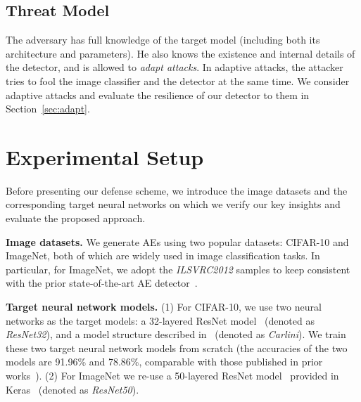 \documentclass[sigconf]{acmart}
\begin{document}
\subsection{Threat Model}

The adversary has full knowledge of the target model (including both its architecture and parameters). He also knows the existence and internal details of the detector, and is allowed to \emph{adapt attacks}. In adaptive attacks, the attacker tries to fool the image classifier and the detector at the same time.
We consider adaptive attacks and evaluate the resilience of our
detector to them in Section~\ref{sec:adapt}.

\section{Experimental Setup}\label{sec:setup}

Before presenting our defense scheme, we introduce the image datasets and the corresponding target neural networks on which we verify our key insights and evaluate the proposed approach.

\vspace{3pt}
\noindent \textbf{Image datasets.} We generate AEs using two popular datasets: CIFAR-10 and ImageNet, both of which are widely used in image classification tasks. In particular, for ImageNet, we adopt the \emph{ILSVRC2012}
samples to keep consistent with the prior state-of-the-art AE detector~\cite{ma2019nic}. 

\vspace{3pt}
\noindent \textbf{Target neural network models.}
(1) For CIFAR-10, we use two neural networks as the target models: a 32-layered ResNet model~\cite{he2016deep} (denoted as \emph{ResNet32}), and 
a model structure described in~\cite{carlini2017towards} (denoted as \emph{Carlini}). We train these two target neural network models from scratch (the accuracies of the two models are 91.96\% and 78.86\%, comparable with those published in prior works~\cite{ma2019nic,xu2017feature}). (2) For ImageNet we re-use a 50-layered ResNet model~\cite{he2016deep} provided in Keras~\cite{chollet2015keras} (denoted as \emph{ResNet50}). 
\end{document}
